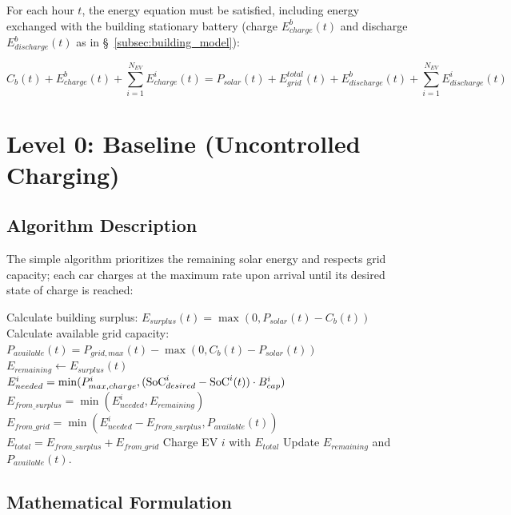 For each hour $t$, the energy equation must be satisfied, including energy exchanged with the building stationary battery (charge $E_{charge}^b(t)$ and discharge $E_{discharge}^b(t)$ as in \S~\ref{subsec:building_model}):

\begin{equation}
C_b(t) + E_{charge}^b(t) + \sum_{i=1}^{N_{EV}} E_{charge}^i(t)
= P_{solar}(t) + E_{grid}^{total}(t) + E_{discharge}^b(t) + \sum_{i=1}^{N_{EV}} E_{discharge}^i(t)
\label{eq:site_energy_balance}
\end{equation}

\section{Level 0: Baseline (Uncontrolled Charging)}
\label{sec:level0_model}


\subsection{Algorithm Description}

The simple algorithm prioritizes the remaining solar energy and respects grid capacity; each car charges at the maximum rate upon arrival until its desired state of charge is reached:

\begin{algorithm}[H]
\caption{Simple Rule-Based Charging}
\label{alg:simple}
\begin{algorithmic}[1]
    \State Calculate building surplus: $E_{surplus}(t) = \max(0, P_{solar}(t) - C_b(t))$
    \State Calculate available grid capacity: $P_{available}(t) = P_{grid,max}(t) - \max(0, C_b(t) - P_{solar}(t))$
    \State $E_{remaining} \gets E_{surplus}(t)$
            \State $E_{needed}^i = \min(P_{max,charge}^{i}, (\text{SoC}_{desired}^i - \text{SoC}^i(t)) \cdot B_{cap}^{i})$
            \State $E_{from\_surplus} = \min(E_{needed}^i, E_{remaining})$
            \State $E_{from\_grid} = \min(E_{needed}^i - E_{from\_surplus}, P_{available}(t))$
            \State $E_{total} = E_{from\_surplus} + E_{from\_grid}$
            \State Charge EV $i$ with $E_{total}$
            \State Update $E_{remaining}$ and $P_{available}(t)$.
        \EndIf
    \EndFor
\EndFor
\end{algorithmic}
\end{algorithm}

\subsection{Mathematical Formulation}

